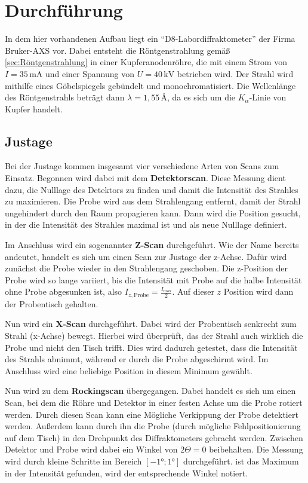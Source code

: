 \section{Durchführung}
\label{sec:Durchführung}

In dem hier vorhandenen Aufbau liegt ein \enquote{D8-Labordiffraktometer} der Firma Bruker-AXS vor.
Dabei entsteht die Röntgenstrahlung gemäß \autoref{sec:Röntgenstrahlung} in einer Kupferanodenröhre, die mit einem Strom von $I=35 \, \unit{\milli\ampere}$ 
und einer Spannung von $U = 40  \, \unit{\kilo\volt}$ betrieben wird.
Der Strahl wird mithilfe eines Göbelspiegels gebündelt und monochromatisiert.
Die Wellenlänge des Röntgenstrahls beträgt dann $\lambda = 1{,}55  \, \unit{\angstrom}$, da es sich um die $K_\alpha$-Linie von Kupfer handelt.

\subsection{Justage} \label{sec:Justage}

Bei der Justage kommen insgesamt vier verschiedene Arten von Scans zum Einsatz.
Begonnen wird dabei mit dem \textbf{Detektorscan}.
Diese Messung dient dazu, die Nulllage des Detektors zu finden und damit die Intensität des Strahles zu maximieren.
Die Probe wird aus dem Strahlengang entfernt, damit der Strahl ungehindert durch den Raum propagieren kann.
Dann wird die Position gesucht, in der die Intensität des Strahles maximal ist und als neue Nulllage definiert.

Im Anschluss wird ein sogenannter \textbf{Z-Scan} durchgeführt.
Wie der Name bereits andeutet, handelt es sich um einen Scan zur Justage der z-Achse.
Dafür wird zunächst die Probe wieder in den Strahlengang geschoben.
Die z-Position der Probe wird so lange variiert, bis die Intensität mit Probe auf die halbe Intensität ohne Probe abgesunken ist, also $I_{z,\text{Probe}} = \frac{I_\text{max}}{2}$.
Auf dieser $z$ Position wird dann der Probentisch gehalten.

Nun wird ein \textbf{X-Scan} durchgeführt.
Dabei wird der Probentisch senkrecht zum Strahl (x-Achse) bewegt.
Hierbei wird überprüft, das der Strahl auch wirklich die Probe und nicht den Tisch trifft.
Dies wird dadurch getestet, dass die Intensität des Strahls abnimmt, während er durch die Probe abgeschirmt wird.
Im Anschluss wird eine beliebige Position in diesem Minimum gewählt.   

Nun wird zu dem \textbf{Rockingscan} übergegangen.
Dabei handelt es sich um einen Scan, bei dem die Röhre und Detektor in einer festen Achse um die Probe rotiert werden.
Durch diesen Scan kann eine Mögliche Verkippung der Probe detektiert werden.
Außerdem kann durch ihn die Probe (durch mögliche Fehlpositionierung auf dem Tisch) in den Drehpunkt des Diffraktometers gebracht werden.
Zwischen Detektor und Probe wird dabei ein Winkel von $2 \Theta = 0$ beibehalten.
Die Messung wird durch kleine Schritte im Bereich $[-1°;1°]$ durchgeführt.
ist das Maximum in der Intensität gefunden, wird der entsprechende Winkel notiert.

